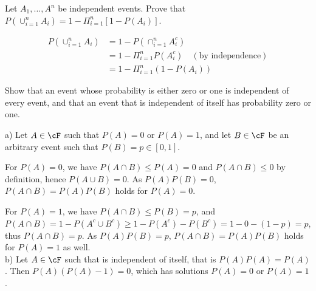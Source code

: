 \begin{exercise}
  Let $A_1,\ldots,A^n$ be independent events. Prove that $P(\cup_{i=1}^nA_i)=1-\Pi_{i=1}^n[1-P(A_i)]$.
\end{exercise}
\begin{solution}
  \begin{align*}
    P(\cup_{i=1}^nA_i) &= 1 - P(\cap_{i=1}^n A_i^c) \\
      &= 1 - \Pi_{i=1}^n P(A_i^c)  \quad(\mbox{by independence}) \\
      &= 1 - \Pi_{i=1}^n (1-P(A_i))
  \end{align*}
\end{solution}


\begin{exercise}
  Show that an event whose probability is either zero or one is independent of every event, and that an event that is independent of itself has probability zero or one.
\end{exercise}
\begin{solution}
  a) Let $A\in\cF$ such that $P(A)=0$ or $P(A)=1$, and let $B\in\cF$ be an arbitrary event such that $P(B)=p\in[0, 1]$.

  For $P(A)=0$, we have $P(A\cap B)\leq P(A) = 0$ and $P(A\cap B)\leq 0$ by definition, hence $P(A\cup B) =0$. As $P(A)P(B)=0$, $P(A\cap B)=P(A)P(B)$ holds for $P(A)=0$.

  For $P(A)=1$, we have $P(A\cap B)\leq P(B) = p$, and $P(A\cap B) = 1 - P(A^c\cup B^c) \geq 1 - P(A^c) - P(B^c) = 1 - 0 - (1-p) = p$, thus $P(A\cap B) = p$. As $P(A)P(B)=p$, $P(A\cap B)=P(A)P(B)$ holds for $P(A)=1$ as well. \\

  b) Let $A\in\cF$ such that is independent of itself, that is $P(A)P(A) = P(A)$. Then $P(A)(P(A)-1)=0$, which has solutions $P(A)=0$ or $P(A)=1$.
\end{solution}
